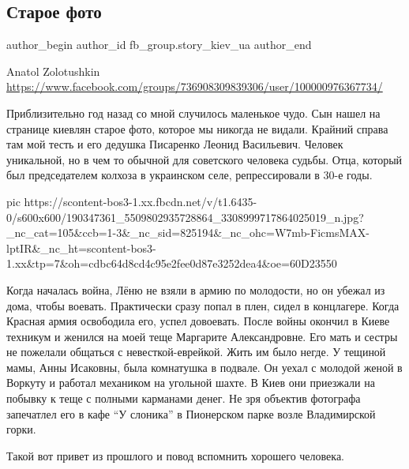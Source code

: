  
 
 
 
 
 
\subsection{Старое фото}
\label{sec:25_05_2021.fb.fb_group.story_kiev_ua.3.staroje_foto}
\ifcmt
 author_begin
   author_id fb_group.story_kiev_ua
 author_end
\fi

Anatol Zolotushkin
\url{https://www.facebook.com/groups/736908309839306/user/100000976367734/}

Приблизительно год назад со мной случилось маленькое чудо. Сын нашел на
странице киевлян старое фото, которое мы никогда не видали. Крайний справа там
мой тесть и его дедушка Писаренко Леонид Васильевич. Человек уникальной, но в
чем то обычной для советского человека судьбы. Отца, который был председателем
колхоза в украинском селе, репрессировали в 30-е годы. 

\ifcmt
  pic https://scontent-bos3-1.xx.fbcdn.net/v/t1.6435-0/s600x600/190347361_5509802935728864_3308999717864025019_n.jpg?_nc_cat=105&ccb=1-3&_nc_sid=825194&_nc_ohc=W7mb-FicmsMAX-lptIR&_nc_ht=scontent-bos3-1.xx&tp=7&oh=cdbc64d8cd4c95e2fee0d87e3252dea4&oe=60D23550
\fi

Когда началась война, Лёню не взяли в армию по молодости, но он убежал из дома,
чтобы воевать. Практически сразу попал в плен, сидел в концлагере. Когда
Красная армия освободила его, успел довоевать. После войны окончил в Киеве
техникум и женился на моей теще Маргарите Александровне. Его мать и сестры не
пожелали  общаться с невесткой-еврейкой. Жить им было негде. У тещиной мамы,
Анны Исаковны, была комнатушка в подвале. Он уехал с молодой женой в Воркуту и
работал механиком на угольной шахте. В Киев они приезжали на побывку к теще с
полными карманами денег. Не зря объектив фотографа запечатлел его в кафе \enquote{У
слоника} в Пионерском парке возле Владимирской горки.

Такой вот привет из прошлого и повод вспомнить хорошего человека.
